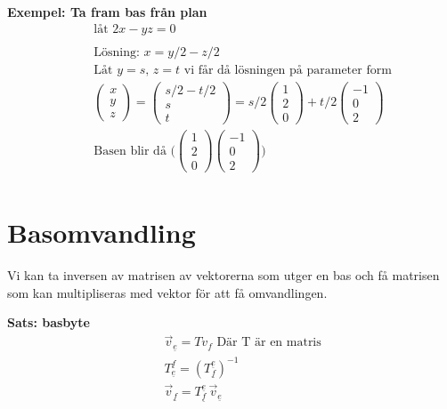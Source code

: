 \textbf{Exempel: Ta fram bas från plan}
\begin{align*}
  &\quad  \text{låt } 2x -y z = 0 \\
  &\quad  \\
  &\quad  \text{Lösning: }  x=y/2 -z/2 \\
  &\quad  \text{Låt } y=s, \, z=t \text{ vi får då lösningen på parameter form} \\
  &\quad  \begin{pmatrix} x \\ y \\ z \end{pmatrix} =
  \begin{pmatrix} s/2 -t/2 \\ s \\ t \end{pmatrix} =
  s/2\begin{pmatrix} 1 \\ 2 \\ 0 \end{pmatrix} +
  t/2\begin{pmatrix} -1 \\ 0 \\ 2 \end{pmatrix} \\
  &\quad  \text{Basen blir då }
  \Big( \begin{pmatrix} 1 \\ 2 \\ 0 \end{pmatrix} \begin{pmatrix} -1 \\ 0 \\ 2 \end{pmatrix} \Big) \\
\end{align*}


\newpage

\section{Basomvandling}
Vi kan ta inversen av matrisen av vektorerna som utger en bas och få
matrisen som kan multipliseras med vektor för att få omvandlingen.

\textbf{Sats: basbyte}
\begin{align*}
  &\quad  \vec{v}_{\underline{e}} = Tv_{f} \text{ Där T är en matris} \\
  &\quad  T^{\underline{f}}_{\underline{e}} = {(T^{\underline{e}}_{\underline{f}})}^{-1} \\
  &\quad  \vec{v}_{\underline{f}} = T^{\underline{e}}_{\underline{f}} \, \vec{v}_{\underline{e}} \\
\end{align*}

